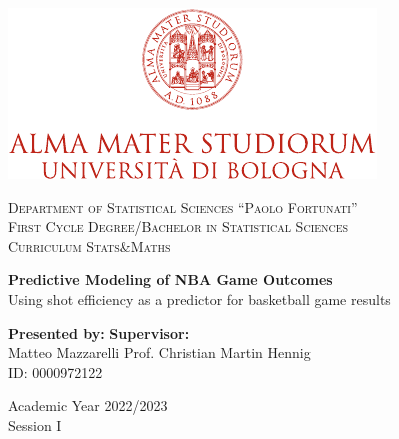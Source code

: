 \begin{titlepage}
    \vspace*{1.75cm}
    \begin{center}
        \includegraphics{./images/unibo-logo.pdf}
    \end{center}
    \vspace{1cm}
    \begin{center}
        {\large \textsc{Department of Statistical Sciences ``Paolo Fortunati''}}\\[0.5cm]
        {\Large \textsc{First Cycle Degree/Bachelor in Statistical Sciences}}\\
        {\Large \textsc{Curriculum Stats\&Maths}}\\[1cm]
    \end{center}
    \vspace{1cm}
    \begin{center}
        {\LARGE \textbf{Predictive Modeling of NBA Game Outcomes}}\\[0.5cm]
        {\Large {Using shot efficiency as a predictor for basketball game results}}\\[1cm]
    \end{center}
    \vfill
    {\large \textbf{Presented by:}}
    \hfill
    {\large \textbf{Supervisor:}}\\
    {\large Matteo Mazzarelli}
    \hfill
    {\large Prof. Christian Martin Hennig}\\
    {\large ID: 0000972122}
    \vfill
    \begin{center}
        {\large{Academic Year 2022/2023\\
                Session I}\\}
    \end{center}
    \vspace*{2.5cm}
\end{titlepage}